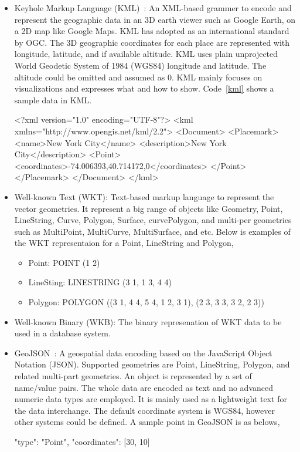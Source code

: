 \documentclass[a4paper,12pt]{article}
\begin{document}
\begin{itemize}
\item Keyhole Markup Language (KML)~\cite{kml}: An XML-based grammer to encode and represent the geographic data in an 3D earth viewer such as Google Earth, on a 2D map like Google Maps. KML has adopted as an international standard by OGC. The 3D geographic coordinates for each place are represented with longitude, latitude, and if available altitude. KML uses plain unprojected World Geodetic System of 1984 (WGS84) longitude and latitude. The altitude could be omitted and assumed as $0$. KML mainly focuses on visualizations and expresses what and how to show. Code~\ref{kml} shows a sample data in KML. 
\vspace{10px}
\begin{fakeXML}[label=kml,caption=A simple KML example representing a Point]
<?xml version="1.0" encoding="UTF-8"?>
<kml xmlns="http://www.opengis.net/kml/2.2">
<Document>
<Placemark>
  <name>New York City</name>
  <description>New York City</description>
  <Point>
    <coordinates>-74.006393,40.714172,0</coordinates>
  </Point>
</Placemark>
</Document>
</kml>
\end{fakeXML} 
\vspace{10px}
\item Well-known Text (WKT): Text-based markup language to represent the vector geometries. It represent a big range of objects like Geometry, Point, LineString, Curve, Polygon, Surface, curvePolygon, and multi-per geometries such as MultiPoint, MultiCurve, MultiSurface, and etc. Below is examples of the WKT representaion for a Point, LineString and Polygon,
\begin{itemize}
\item Point: POINT (1 2)
\item LineSting: LINESTRING (3 1, 1 3, 4 4)
\item Polygon: POLYGON ((3 1, 4 4, 5 4, 1 2, 3 1),
			(2 3, 3 3, 3 2, 2 3))
\end{itemize}
\item Well-known Binary (WKB): The binary represenation of WKT data to be used in a database system.
\item GeoJSON~\cite{www/geojson}: A geospatial data encoding based on the JavaScript Object Notation (JSON). Supported geometries are Point, LineString, Polygon, and related multi-part geometries. An object is represented by a set of name/value pairs. The whole data are encoded as text and no advanced numeric data types are employed. It is mainly used as a lightweight text for the data interchange. The default coordinate system is WGS84, however other systems could be defined. A sample point in GeoJSON is as belows,
\vspace{10px} 
\begin{fakeJSON}
{
    "type": "Point", 
    "coordinates": [30, 10]
}
\end{fakeJSON}
\vspace{10px}
\end{itemize}
\end{document}
